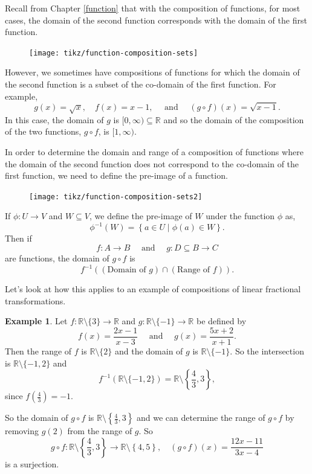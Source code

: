 \documentclass[
]{book}
\theoremstyle{definition}
\theoremstyle{definition}
\newtheorem{example}{Example}[chapter]
\theoremstyle{definition}
\theoremstyle{definition}
\theoremstyle{remark}
\begin{document}
Recall from Chapter \ref{function} that with the composition of functions, for most cases, the domain of the second function corresponds with the domain of the first function.

\begin{figure}

{\centering \texttt{[image: tikz/function-composition-sets]} 

}

\end{figure}

However, we sometimes have compositions of functions for which the domain of the second function is a subset of the co-domain of the first function. For example,
\[g(x) = \sqrt{x}, \quad f(x)=x-1, \quad \mbox{ and } \quad (g\circ f)(x) = \sqrt{x-1}.\]
In this case, the domain of \(g\) is \([0,\infty) \subseteq \mathbb{R}\) and so the domain of the composition of the two functions, \(g\circ f\), is \([1,\infty)\).

In order to determine the domain and range of a composition of functions where the domain of the second function does not correspond to the co-domain of the first function, we need to define the pre-image of a function.

\begin{figure}

{\centering \texttt{[image: tikz/function-composition-sets2]} 

}

\end{figure}

If \(\phi:U\rightarrow V\) and \(W \subseteq V\), we define the pre-image of \(W\) under the function \(\phi\) as,
\[\phi^{-1}(W) = \left\{ a\in U \middle \vert \phi(a)\in W\right\}.\] Then if \[f:A\rightarrow B \quad \mbox{ and } \quad g:D\subseteq B \rightarrow C\] are functions, the domain of \(g\circ f\) is \[f^{-1} \left( (\mbox{Domain of } g) \cap (\mbox{Range of } f)\right).\]

Let's look at how this applies to an example of compositions of linear fractional transformations.

\begin{example}
Let \(f:\mathbb{R}\setminus \{3\} \rightarrow \mathbb{R}\) and \(g:\mathbb{R}\setminus \{-1\} \rightarrow \mathbb{R}\) be defined by \[f(x) = \frac{2x-1}{x-3} \quad \mbox{ and } \quad g(x)=\frac{5x+2}{x+1}.\]
Then the range of \(f\) is \(\mathbb{R} \setminus \{2\}\) and the domain of \(g\) is \(\mathbb{R}\setminus \{-1\}\). So the intersection is \(\mathbb{R}\setminus \{-1,2\}\) and
\[f^{-1} \left(\mathbb{R} \setminus \{-1,2\} \right) = \mathbb{R} \setminus \left\{\frac{4}{3}, 3\right\},\] since \(f\left(\frac{4}{3}\right) = -1\).

So the domain of \(g\circ f\) is \(\mathbb{R} \setminus \left\{\frac{4}{3}, 3\right\}\) and we can determine the range of \(g\circ f\) by removing \(g(2)\) from the range of \(g\). So
\[g\circ f : \mathbb{R} \setminus \left\{\frac{4}{3}, 3\right\} \rightarrow \mathbb{R} \setminus \left\{ 4,5 \right\}, \quad (g\circ f) (x) = \frac{12x-11}{3x-4}\] is a surjection.
\end{example}
\end{document}
